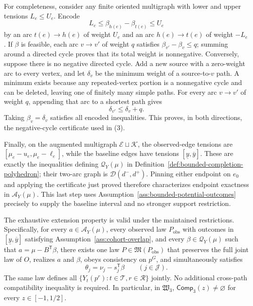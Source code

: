 For completeness, consider any finite oriented multigraph with lower and upper tensions \(L_e\le U_e\).  Encode
\[
 L_e\le\beta_{h(e)}-\beta_{t(e)}\le U_e
\]
by an arc \(t(e)\to h(e)\) of weight \(U_e\) and an arc \(h(e)\to t(e)\) of weight \(-L_e\).  If \(\beta\) is feasible, each arc \(v\to v'\) of weight \(q\) satisfies \(\beta_{v'}-\beta_v\le q\); summing around a directed cycle proves that its total weight is nonnegative.  Conversely, suppose there is no negative directed cycle.  Add a new source with a zero-weight arc to every vertex, and let \(\delta_v\) be the minimum weight of a source-to-\(v\) path.  A minimum exists because any repeated-vertex portion is a nonnegative cycle and can be deleted, leaving one of finitely many simple paths.  For every arc \(v\to v'\) of weight \(q\), appending that arc to a shortest path gives
\[
 \delta_{v'}\le\delta_v+q.
\]
Taking \(\beta_v=\delta_v\) satisfies all encoded inequalities.  This proves, in both directions, the negative-cycle certificate used in (3).

Finally, on the augmented multigraph \(\mathcal E\sqcup\mathcal K\), the observed-edge tensions are \([\mu_e-u_e,\mu_e-\ell_e]\), while the baseline edges have tensions \([\underline y,\overline y]\).  These are exactly the inequalities defining \(\mathcal Q_Y(\mu)\) in Definition~\ref{def:bounded-completion-polyhedron}; their two-arc graph is \(\mathcal D(d^-,d^+)\).  Pinning either endpoint on \(e_0\) and applying the certificate just proved therefore characterizes endpoint exactness in \(\mathcal A_Y(\mu)\).  This last step uses Assumption~\ref{ass:bounded-potential-outcomes} precisely to supply the baseline interval and no stronger support restriction.

The exhaustive extension property is valid under the maintained restrictions.  Specifically, for every \(a\in\mathcal A_Y(\mu)\), every observed law \(P_{\mathrm{obs}}\) with outcomes in \([\underline y,\overline y]\) satisfying Assumption~\ref{ass:cohort-overlap}, and every \(\beta\in\mathcal Q_Y(\mu)\) such that \(a=\mu-B^{\mathsf T}\beta\), there exists one law \(P\in\mathfrak M(P_{\mathrm{obs}})\) that preserves the full joint law of \(O\), realizes \(a\) and \(\beta\), obeys consistency on \(p^G\), and simultaneously satisfies
\[
 \theta_j=\nu_j-s_j^{\mathsf T}\beta
 \qquad(j\in\mathcal J).
\]
The same law defines all \(\{Y_t(p^r):t\in\mathcal T,r\in\mathcal R\}\) jointly.  No additional cross-path compatibility inequality is required.  In particular, in \(\mathfrak W_3\), \(\mathsf{Comp}_3(z)\ne\varnothing\) for every \(z\in[-1,1/2]\).

